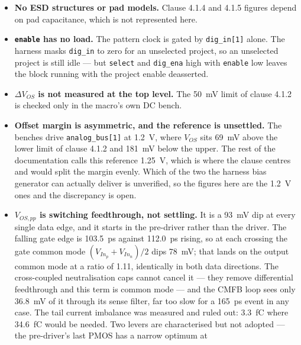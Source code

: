 \documentclass[a4paper,10pt]{article}
\newcommand{\net}[1]{\texttt{#1}}
\begin{document}
\begin{itemize}[leftmargin=*]
  \item \textbf{No ESD structures or pad models.} Clause 4.1.4 and 4.1.5 figures
        depend on pad capacitance, which is not represented here.
  \item \textbf{\net{enable} has no load.} The pattern clock is gated by
        \net{dig\_in[1]} alone. The harness masks \net{dig\_in} to zero for an
        unselected project, so an unselected project is still idle --- but
        \net{select} and \net{dig\_ena} high with \net{enable} low leaves the
        block running with the project enable deasserted.
  \item \textbf{$\Delta V_{OS}$ is not measured at the top level.} The
        \SI{50}{\milli\volt} limit of clause 4.1.2 is checked only in the macro's
        own DC bench.
  \item \textbf{Offset margin is asymmetric, and the reference is unsettled.}
        The benches drive \net{analog\_bus[1]} at \SI{1.2}{\volt}, where
        $V_{OS}$ sits \SI{69}{\milli\volt} above the lower limit of clause
        4.1.2 and \SI{181}{\milli\volt} below the upper. The rest of the
        documentation calls this reference \SI{1.25}{\volt}, which is where the
        clause centres and would split the margin evenly. Which of the two the
        harness bias generator can actually deliver is unverified, so the
        figures here are the \SI{1.2}{\volt} ones and the discrepancy is open.
  \item \textbf{$V_{OS,pp}$ is switching feedthrough, not settling.} It is a
        \SI{93}{\milli\volt} dip at every single data edge, and it starts in
        the pre-driver rather than the driver. The falling gate edge is
        \SI{103.5}{\pico\second} against \SI{112.0}{\pico\second} rising, so at
        each crossing the gate common mode $(V_{In_p}+V_{In_n})/2$ dips
        \SI{78}{\milli\volt}; that lands on the output common mode at a ratio
        of 1.11, identically in both data directions. The cross-coupled
        neutralisation caps cannot cancel it --- they remove differential
        feedthrough and this term is common mode --- and the CMFB loop sees
        only \SI{36.8}{\milli\volt} of it through its sense filter, far too
        slow for a \SI{165}{\pico\second} event in any case. The tail current
        imbalance was measured and ruled out: \SI{3.3}{\femto\coulomb} where
        \SI{34.6}{\femto\coulomb} would be needed. Two levers are characterised
        but not adopted --- the pre-driver's last PMOS has a narrow optimum at

\end{itemize}
\end{document}
